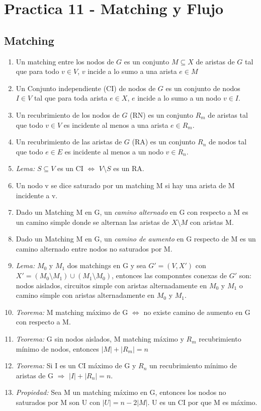 \section{Practica 11 - Matching y Flujo}
\subsection{Matching}
\begin{enumerate}
\item Un matching entre los nodos de $G$ es un conjunto $M \subseteq X$ de aristas de $G$ tal que para todo $v \in V$, $v$ incide a lo sumo a una arista $e \in M$
\item Un Conjunto independiente (CI) de nodos de $G$ es un conjunto de nodos $I \in V$ tal que para toda arista $e \in X$, $e$ incide a lo sumo a un nodo $v \in I$.
\item Un recubrimiento de los nodos de $G$ (RN) es un conjunto $R_{m}$ de aristas tal que todo $v \in V$ es incidente al menos a una arista $e \in R_{m}$.
\item Un recubrimiento de las aristas de $G$ (RA) es un conjunto $R_{n}$ de nodos tal que todo $e \in E$ es incidente al menos a un nodo $v \in R_{n}$.
\item \textit{Lema:} $S \subseteq V$ es un CI $\iff$ $V \setminus S$ es un RA.
\item Un nodo v se dice saturado por un matching M si hay una arista de M incidente a v.
\item Dado un Matching M en G, un \textit{camino alternado} en G con respecto a M es un camino simple donde se alternan las aristas de $X \setminus M$ con aristas M.
\item Dado un Matching M en G, un \textit{camino de aumento} en G respecto de M es un camino alternado entre nodos no saturados por M.
\item \textit{Lema:} $M_{0}$ y $M_{1}$ dos matchings en G y sea $G'=(V,X')$ con $X'=(M_{0} \setminus M_{1}) \cup (M_{1} \setminus M_{0})$, entonces las componntes conexas de $G'$ son: nodos aislados, circuitos simple con aristas alternadamente en $M_{0}$ y $M_{1}$ o camino simple con aristas alternadamente en $M_{0}$ y $M_{1}$.
\item \textit{Teorema:} M matching máximo de G $\iff$ no existe camino de aumento en G con respecto a M.
\item \textit{Teorema:} G sin nodos aislados, M matching máximo y $R_{m}$ recubrimiento mínimo de nodos, entonces $|M|+|R_{m}|=n$
\item \textit{Teorema:} Si I es un CI máximo de G y $R_{n}$ un recubrimiento mínimo de aristas de G $\Rightarrow$ $|I|+|R_{n}|=n$.
\item \textit{Propiedad:} Sea M un matching máximo en G, entonces los nodos no saturados por M son U con $|U|=n-2|M|$. U es un CI por que M es máximo.
\end{enumerate}

